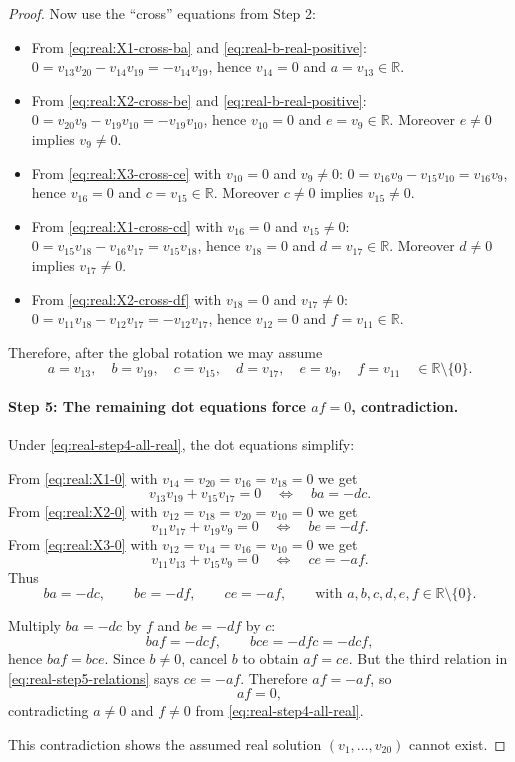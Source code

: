\documentclass[11pt]{article}
\begin{document}
\begin{proof}
Now use the ``cross'' equations from Step 2:
\begin{itemize}
\item From \eqref{eq:real:X1-cross-ba} and \eqref{eq:real-b-real-positive}:
$0=v_{13}v_{20}-v_{14}v_{19}=-v_{14}v_{19}$, hence $v_{14}=0$ and $a=v_{13}\in\mathbb R$.
\item From \eqref{eq:real:X2-cross-be} and \eqref{eq:real-b-real-positive}:
$0=v_{20}v_{9}-v_{19}v_{10}=-v_{19}v_{10}$, hence $v_{10}=0$ and $e=v_{9}\in\mathbb R$.
Moreover $e\neq 0$ implies $v_9\neq 0$.
\item From \eqref{eq:real:X3-cross-ce} with $v_{10}=0$ and $v_9\neq 0$:
$0=v_{16}v_{9}-v_{15}v_{10}=v_{16}v_{9}$, hence $v_{16}=0$ and $c=v_{15}\in\mathbb R$.
Moreover $c\neq 0$ implies $v_{15}\neq 0$.
\item From \eqref{eq:real:X1-cross-cd} with $v_{16}=0$ and $v_{15}\neq 0$:
$0=v_{15}v_{18}-v_{16}v_{17}=v_{15}v_{18}$, hence $v_{18}=0$ and $d=v_{17}\in\mathbb R$.
Moreover $d\neq 0$ implies $v_{17}\neq 0$.
\item From \eqref{eq:real:X2-cross-df} with $v_{18}=0$ and $v_{17}\neq 0$:
$0=v_{11}v_{18}-v_{12}v_{17}=-v_{12}v_{17}$, hence $v_{12}=0$ and $f=v_{11}\in\mathbb R$.
\end{itemize}
Therefore, after the global rotation we may assume
\begin{equation}
a=v_{13},\quad b=v_{19},\quad c=v_{15},\quad d=v_{17},\quad e=v_9,\quad f=v_{11}
\quad\in\mathbb R\setminus\{0\}.
\label{eq:real-step4-all-real}
\end{equation}

\paragraph{Step 5: The remaining dot equations force $af=0$, contradiction.}
Under \eqref{eq:real-step4-all-real}, the dot equations simplify:

\smallskip
\noindent From \eqref{eq:real:X1-0} with $v_{14}=v_{20}=v_{16}=v_{18}=0$ we get
\[
v_{13}v_{19}+v_{15}v_{17}=0
\quad\Longleftrightarrow\quad
ba=-dc.
\]
From \eqref{eq:real:X2-0} with $v_{12}=v_{18}=v_{20}=v_{10}=0$ we get
\[
v_{11}v_{17}+v_{19}v_{9}=0
\quad\Longleftrightarrow\quad
be=-df.
\]
From \eqref{eq:real:X3-0} with $v_{12}=v_{14}=v_{16}=v_{10}=0$ we get
\[
v_{11}v_{13}+v_{15}v_{9}=0
\quad\Longleftrightarrow\quad
ce=-af.
\]
Thus
\begin{equation}
ba=-dc,\qquad be=-df,\qquad ce=-af,
\qquad\text{with }a,b,c,d,e,f\in\mathbb R\setminus\{0\}.
\label{eq:real-step5-relations}
\end{equation}

Multiply $ba=-dc$ by $f$ and $be=-df$ by $c$:
\[
baf=-dcf,\qquad bce=-dfc=-dcf,
\]
hence $baf=bce$. Since $b\neq 0$, cancel $b$ to obtain $af=ce$.
But the third relation in \eqref{eq:real-step5-relations} says $ce=-af$.
Therefore $af=-af$, so
\[
af=0,
\]
contradicting $a\neq 0$ and $f\neq 0$ from \eqref{eq:real-step4-all-real}.

This contradiction shows the assumed real solution $(v_1,\dots,v_{20})$ cannot exist.
\end{proof}
\end{document}
